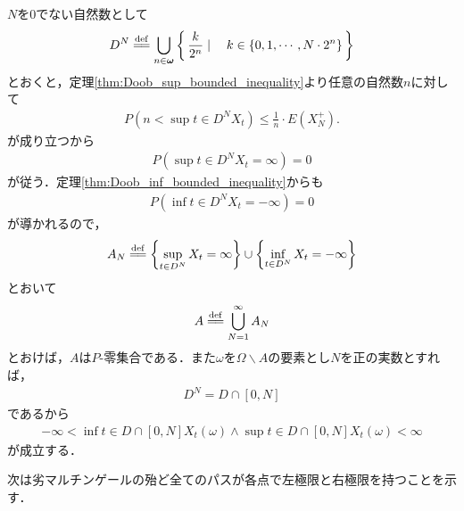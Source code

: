 	\begin{sketch}
		$N$を$0$でない自然数として
		\begin{align}
			D^N \defeq \bigcup_{n \in \Natural} \Set{\frac{k}{2^n}}{k \in \{0,1,\cdots,N \cdot 2^n\}}
		\end{align}
		とおくと，定理\ref{thm:Doob_sup_bounded_inequality}より任意の自然数$n$に対して
		\begin{align}
			P\left(n < \sup{t \in D^N}{X_t}\right)
			\leq \frac{1}{n} \cdot E\left(X_N^+\right).
		\end{align}
		が成り立つから
		\begin{align}
			P\left(\sup{t \in D^N}{X_t} = \infty\right) = 0
		\end{align}
		が従う．定理\ref{thm:Doob_inf_bounded_inequality}からも
		\begin{align}
			P\left(\inf{t \in D^N}{X_t} = -\infty\right) = 0
		\end{align}
		が導かれるので，
		\begin{align}
			A_N \defeq \left\{\sup{t \in D^N}{X_t} = \infty\right\} \cup \left\{\inf{t \in D^N}{X_t} = -\infty\right\}
		\end{align}
		とおいて
		\begin{align}
			A \defeq \bigcup_{N=1}^\infty A_N
		\end{align}
		とおけば，$A$は$P$-零集合である．また$\omega$を$\Omega \backslash A$の要素とし$N$を正の実数とすれば，
		\begin{align}
			D^N = D \cap [0,N]
		\end{align}
		であるから
		\begin{align}
			- \infty < \inf{t \in D \cap [0,N]}X_t(\omega) \wedge \sup{t \in D \cap [0,N]}X_t(\omega) < \infty
		\end{align}
		が成立する．
		\QED
	\end{sketch}
	
	次は劣マルチンゲールの殆ど全てのパスが各点で左極限と右極限を持つことを示す．
	
